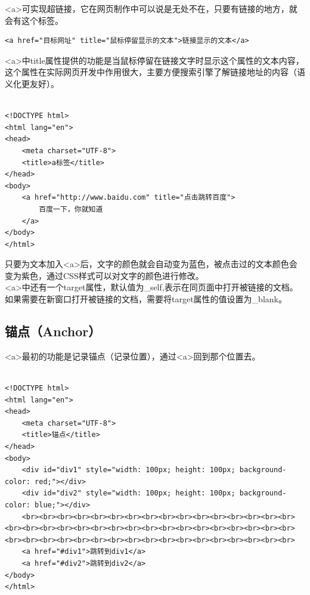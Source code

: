<a>可实现超链接，它在网页制作中可以说是无处不在，只要有链接的地方，就会有这个标签。\\

\begin{lstlisting}[style=htmlcssjs]
<a href="目标网址" title="鼠标停留显示的文本">链接显示的文本</a>
\end{lstlisting}

<a>中title属性提供的功能是当鼠标停留在链接文字时显示这个属性的文本内容，这个属性在实际网页开发中作用很大，主要方便搜索引擎了解链接地址的内容（语义化更友好）。\\

\\

\begin{lstlisting}[style=htmlcssjs]
<!DOCTYPE html>
<html lang="en">
<head>
    <meta charset="UTF-8">
    <title>a标签</title>
</head>
<body>
    <a href="http://www.baidu.com" title="点击跳转百度">
        百度一下，你就知道
    </a>
</body>
</html>
\end{lstlisting}

只要为文本加入<a>后，文字的颜色就会自动变为蓝色，被点击过的文本颜色会变为紫色，通过CSS样式可以对文字的颜色进行修改。\\

<a>中还有一个target属性，默认值为\_self,表示在同页面中打开被链接的文档。如果需要在新窗口打开被链接的文档，需要将target属性的值设置为\_blank。\\

\subsection{锚点（Anchor）}

<a>最初的功能是记录锚点（记录位置），通过<a>回到那个位置去。\\

\\

\begin{lstlisting}[style=htmlcssjs, breaklines=true, breakatwhitespace=false]
<!DOCTYPE html>
<html lang="en">
<head>
    <meta charset="UTF-8">
    <title>锚点</title>
</head>
<body>
    <div id="div1" style="width: 100px; height: 100px; background-color: red;"></div>
    <div id="div2" style="width: 100px; height: 100px; background-color: blue;"></div>
    <br><br><br><br><br><br><br><br><br><br><br><br><br><br><br><br><br><br><br><br><br><br><br><br><br><br><br><br><br><br><br><br><br><br><br><br><br><br><br><br><br><br><br><br><br><br><br><br><br><br>
    <a href="#div1">跳转到div1</a>
    <a href="#div2">跳转到div2</a>
</body>
</html>
\end{lstlisting}

